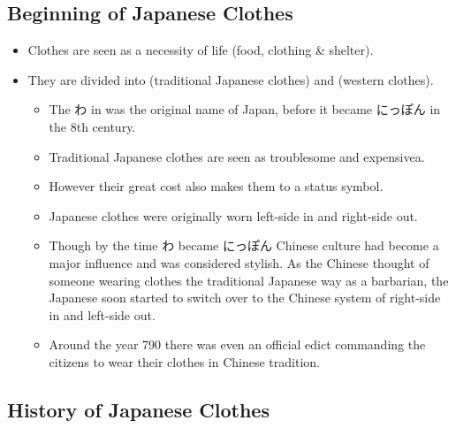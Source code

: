 \documentclass{article}
\begin{document}
\subsection{Beginning of Japanese Clothes}
\begin{itemize}
    \item Clothes are seen as a  necessity of life (food, clothing \& shelter).
    \item They are divided into  (traditional Japanese clothes) and \ruby{}{} (western clothes).
    \begin{itemize}
        \item The わ in  was the original name of Japan, before it became にっぽん in the 8th century.
        \item Traditional Japanese clothes are seen as troublesome and expensivea.
        \item However their great cost also makes them to a status symbol.
        \item Japanese clothes were originally worn left-side in and right-side out.
        \item Though by the time わ became にっぽん Chinese culture had become a major influence and was considered stylish. As the Chinese thought of someone wearing clothes the traditional Japanese way as a barbarian, the Japanese soon started to switch over to the Chinese system of right-side in and left-side out.
        \item Around the year 790 there was even an official edict commanding the citizens to wear their clothes in Chinese tradition.
    \end{itemize}
\end{itemize}
\subsection{History of Japanese Clothes}
\end{document}
